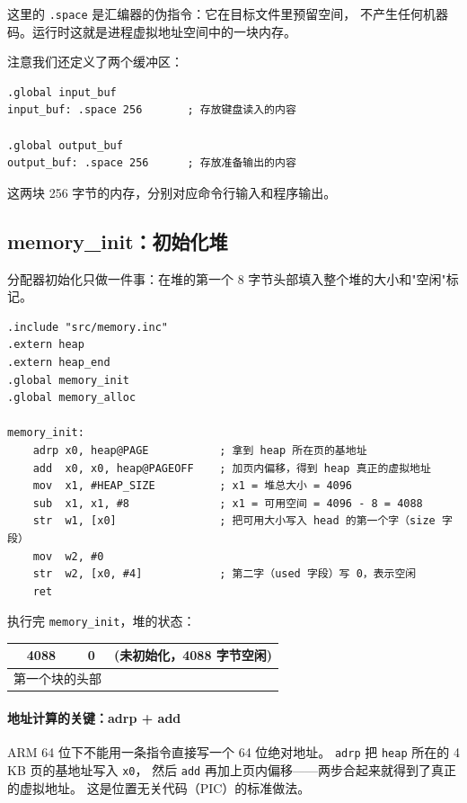 这里的 \texttt{.space} 是汇编器的伪指令：它在目标文件里预留空间，
不产生任何机器码。运行时这就是进程虚拟地址空间中的一块内存。

注意我们还定义了两个缓冲区：

\begin{lstlisting}[style=asm,caption=hello.s 中的 I/O 缓冲区]
.global input_buf
input_buf: .space 256       ; 存放键盘读入的内容

.global output_buf
output_buf: .space 256      ; 存放准备输出的内容
\end{lstlisting}

这两块 256 字节的内存，分别对应命令行输入和程序输出。

\subsection{memory\_init：初始化堆}

分配器初始化只做一件事：在堆的第一个 8 字节头部填入整个堆的大小和"空闲"标记。

\begin{lstlisting}[style=asm,caption=memory.s — memory\_init]
.include "src/memory.inc"
.extern heap
.extern heap_end
.global memory_init
.global memory_alloc

memory_init:
    adrp x0, heap@PAGE           ; 拿到 heap 所在页的基地址
    add  x0, x0, heap@PAGEOFF    ; 加页内偏移，得到 heap 真正的虚拟地址
    mov  x1, #HEAP_SIZE          ; x1 = 堆总大小 = 4096
    sub  x1, x1, #8              ; x1 = 可用空间 = 4096 - 8 = 4088
    str  w1, [x0]                ; 把可用大小写入 head 的第一个字（size 字段）
    mov  w2, #0
    str  w2, [x0, #4]            ; 第二字（used 字段）写 0，表示空闲
    ret
\end{lstlisting}

执行完 \texttt{memory\_init}，堆的状态：

\begin{center}
\begin{tabular}{|c|c|c|}
\hline
4088 & 0 & (未初始化，4088 字节空闲) \\
\hline
\multicolumn{2}{|c|}{第一个块的头部} & \\
\hline
\end{tabular}
\end{center}

\paragraph{地址计算的关键：adrp + add}
ARM 64 位下不能用一条指令直接写一个 64 位绝对地址。
\texttt{adrp} 把 \texttt{heap} 所在的 4 KB 页的基地址写入 \texttt{x0}，
然后 \texttt{add} 再加上页内偏移——两步合起来就得到了真正的虚拟地址。
这是位置无关代码（PIC）的标准做法。

